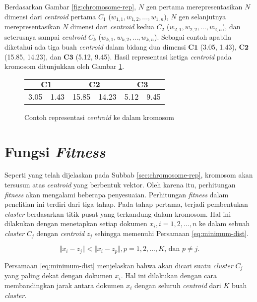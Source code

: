 Berdasarkan Gambar \ref{fig:chromosome-rep}, $N$ gen pertama merepresentasikan $N$ dimensi dari \textit{centroid} pertama $C_1$ ($w_{1,1}, w_{1,2}, ..., w_{1,n}$), $N$ gen selanjutnya merepresentasikan $N$ dimensi dari \textit{centroid} kedua $C_2$ ($w_{2,1}, w_{2,2}, ..., w_{2,n}$), dan seterusnya sampai \textit{centroid} $C_k$ ($w_{k,1}, w_{k,2}, ..., w_{k,n}$). Sebagai contoh apabila diketahui ada tiga buah \textit{centroid} dalam bidang dua dimensi $\mathbf{C1}$ (3.05, 1.43), $\mathbf{C2}$ (15.85, 14.23), dan $\mathbf{C3}$ (5.12, 9.45). Hasil representasi ketiga \textit{centroid} pada kromosom ditunjukkan oleh Gambar \ref{fig:chromosome}.

\begin{figure}[H]
	\centering
	\begin{tabular}{|c|c|c|c|c|c|}
		\multicolumn{2}{c}{\textbf{$\mathbf{C1}$}} & \multicolumn{2}{c}{\textbf{$\mathbf{C2}$}} & \multicolumn{2}{c}{$\mathbf{C3}$}\\ \hline
		3.05 & 1.43 & 15.85 & 14.23 & 5.12 & 9.45\\ \hline
	\end{tabular}
	\caption{Contoh representasi \textit{centroid} ke dalam kromosom}
	\label{fig:chromosome}
\end{figure}

\section{Fungsi \textit{Fitness}}
\label{sec:func-fitness-analysis}
Seperti yang telah dijelaskan pada Subbab \ref{sec:chromosome-rep}, kromosom akan tersusun atas \textit{centroid} yang berbentuk vektor. Oleh karena itu, perhitungan \textit{fitness} akan mengalami beberapa penyesuaian. Perhitungan \textit{fitness} dalam penelitian ini terdiri dari tiga tahap. Pada tahap pertama, terjadi pembentukan \textit{cluster} berdasarkan titik pusat yang terkandung dalam kromosom. Hal ini dilakukan dengan menetapkan setiap dokumen $x_i,i=1,2, ... ,n$ ke dalam sebuah \textit{cluster} $C_j$ dengan \textit{centroid} $z_j$ sehingga memenuhi Persamaan \ref{eq:minimum-dist}.

\begin{equation}
\label{eq:minimum-dist}
\Vert x_i-z_j \Vert < \Vert x_i-z_p \Vert , p=1,2, ... ,K \mbox{, dan } p \neq j.
\end{equation}

Persamaan \ref{eq:minimum-dist} menjelaskan bahwa akan dicari suatu \textit{cluster} $C_j$ yang paling dekat dengan dokumen $x_i$. Hal ini dilakukan dengan cara membandingkan jarak antara dokumen $x_i$ dengan seluruh \textit{centroid} dari $K$ buah \textit{cluster}. 

